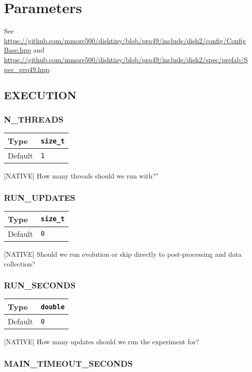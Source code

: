 \section{Parameters}

\newcommand{\confdef}[2]{
    \begin{tabular}{|
        >{\columncolor[HTML]{C0C0C0}}l |l|}
        \hline
        Type & \texttt{#1} \\ \hline
        Default   & \texttt{#2} \\ \hline
    \end{tabular}
}

See \url{https://github.com/mmore500/dishtiny/blob/prq49/include/dish2/config/ConfigBase.hpp} and \url{https://github.com/mmore500/dishtiny/blob/prq49/include/dish2/spec/prefab/Spec\_prq49.hpp}.

\subsection{EXECUTION}


\subsubsection{N\_THREADS}

\confdef{size\_t}{1}

[NATIVE] How many threads should we run with?"

\subsubsection{RUN\_UPDATES}

\confdef{size\_t}{0}

[NATIVE] Should we run evolution or skip directly to post-processing and data collection?

\subsubsection{RUN\_SECONDS}

\confdef{double}{0}

[NATIVE] How many updates should we run the experiment for?

\subsubsection{MAIN\_TIMEOUT\_SECONDS}

